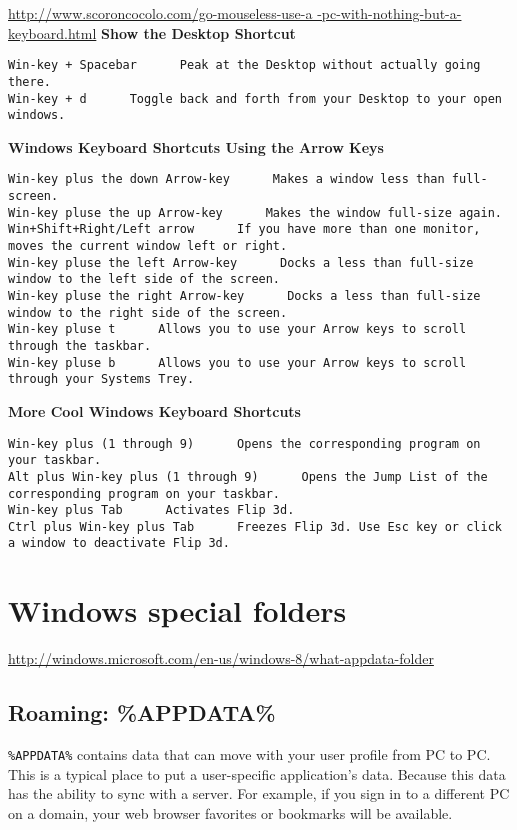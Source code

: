 \url{http://www.scoroncocolo.com/go-mouseless-use-a -pc-with-nothing-but-a-keyboard.html}
{\bf Show the Desktop Shortcut}
\begin{verbatim}
Win-key + Spacebar      Peak at the Desktop without actually going there.
Win-key + d      Toggle back and forth from your Desktop to your open windows.
\end{verbatim}

{\bf Windows Keyboard Shortcuts Using the Arrow Keys}
\begin{verbatim}
Win-key plus the down Arrow-key      Makes a window less than full-screen.
Win-key pluse the up Arrow-key      Makes the window full-size again.
Win+Shift+Right/Left arrow      If you have more than one monitor, moves the current window left or right.
Win-key pluse the left Arrow-key      Docks a less than full-size window to the left side of the screen.
Win-key pluse the right Arrow-key      Docks a less than full-size window to the right side of the screen.
Win-key pluse t      Allows you to use your Arrow keys to scroll through the taskbar.
Win-key pluse b      Allows you to use your Arrow keys to scroll through your Systems Trey.
\end{verbatim}

{\bf More Cool Windows Keyboard Shortcuts}
\begin{verbatim}
Win-key plus (1 through 9)      Opens the corresponding program on your taskbar.
Alt plus Win-key plus (1 through 9)      Opens the Jump List of the corresponding program on your taskbar.
Win-key plus Tab      Activates Flip 3d.
Ctrl plus Win-key plus Tab      Freezes Flip 3d. Use Esc key or click a window to deactivate Flip 3d.

\end{verbatim}


\section{Windows special folders}

\url{http://windows.microsoft.com/en-us/windows-8/what-appdata-folder}
\subsection{Roaming: \%APPDATA\%}

\verb!%APPDATA%!
contains data that can move with your user profile from PC to PC.
This is a typical place to put a user-specific application's data.
Because this data has the ability to sync with a server. For example, if you
sign in to a different PC on a domain, your web browser favorites or bookmarks
will be available.


